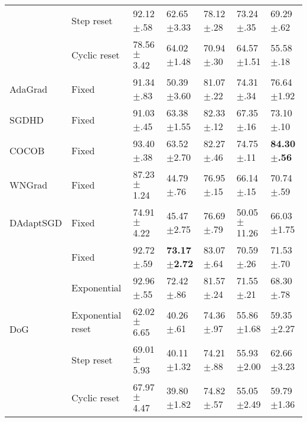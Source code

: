 \begin{tabular}{lllllll}
                             & Step reset        & 92.12$\pm$.58           & 62.65$\pm$3.33           & 78.12$\pm$.28           & 73.24$\pm$.35           & 69.29$\pm$.62           \\
                             & Cyclic reset      & 78.56$\pm$3.42          & 64.02$\pm$1.48           & 70.94$\pm$.30           & 64.57$\pm$1.51          & 55.58$\pm$.18           \\
    AdaGrad                  & Fixed             & 91.34$\pm$.83           & 50.39$\pm$3.60           & 81.07$\pm$.22           & 74.31$\pm$.34           & 76.64$\pm$1.92          \\
    SGDHD                    & Fixed             & 91.03$\pm$.45           & 63.38$\pm$1.55           & 82.33$\pm$.12           & 67.35$\pm$.16           & 73.10$\pm$.10           \\
    COCOB                    & Fixed             & 93.40$\pm$.38           & 63.52$\pm$2.70           & 82.27$\pm$.46           & 74.75$\pm$.11           & \bfseries 84.30$\pm$.56 \\
    WNGrad                   & Fixed             & 87.23$\pm$1.24          & 44.79$\pm$.76            & 76.95$\pm$.15           & 66.14$\pm$.15           & 70.74$\pm$.59           \\
    DAdaptSGD                & Fixed             & 74.91$\pm$4.22          & 45.47$\pm$2.75           & 76.69$\pm$.79           & 50.05$\pm$11.26         & 66.03$\pm$1.75          \\
    \multirow[c]{5}{*}{DoG}  & Fixed             & 92.72$\pm$.59           & \bfseries 73.17$\pm$2.72 & 83.07$\pm$.64           & 70.59$\pm$.26           & 71.53$\pm$.70           \\
                             & Exponential       & 92.96$\pm$.55           & 72.42$\pm$.86            & 81.57$\pm$.24           & 71.55$\pm$.21           & 68.30$\pm$.78           \\
                             & Exponential reset & 62.02$\pm$6.65          & 40.26$\pm$.61            & 74.36$\pm$.97           & 55.86$\pm$1.68          & 59.35$\pm$2.27          \\
                             & Step reset        & 69.01$\pm$5.93          & 40.11$\pm$1.32           & 74.21$\pm$.88           & 55.93$\pm$2.00          & 62.66$\pm$3.23          \\
                             & Cyclic reset      & 67.97$\pm$4.47          & 39.80$\pm$1.82           & 74.82$\pm$.57           & 55.05$\pm$2.49          & 59.79$\pm$1.36          \\
    \bottomrule
\end{tabular}
